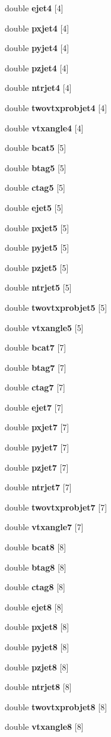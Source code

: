 \begin{DoxyCompactItemize}
double {\bf ejet4} [4]
\item 
double {\bf pxjet4} [4]
\item 
double {\bf pyjet4} [4]
\item 
double {\bf pzjet4} [4]
\item 
double {\bf ntrjet4} [4]
\item 
double {\bf twovtxprobjet4} [4]
\item 
double {\bf vtxangle4} [4]
\item 
double {\bf bcat5} [5]
\item 
double {\bf btag5} [5]
\item 
double {\bf ctag5} [5]
\item 
double {\bf ejet5} [5]
\item 
double {\bf pxjet5} [5]
\item 
double {\bf pyjet5} [5]
\item 
double {\bf pzjet5} [5]
\item 
double {\bf ntrjet5} [5]
\item 
double {\bf twovtxprobjet5} [5]
\item 
double {\bf vtxangle5} [5]
\item 
double {\bf bcat7} [7]
\item 
double {\bf btag7} [7]
\item 
double {\bf ctag7} [7]
\item 
double {\bf ejet7} [7]
\item 
double {\bf pxjet7} [7]
\item 
double {\bf pyjet7} [7]
\item 
double {\bf pzjet7} [7]
\item 
double {\bf ntrjet7} [7]
\item 
double {\bf twovtxprobjet7} [7]
\item 
double {\bf vtxangle7} [7]
\item 
double {\bf bcat8} [8]
\item 
double {\bf btag8} [8]
\item 
double {\bf ctag8} [8]
\item 
double {\bf ejet8} [8]
\item 
double {\bf pxjet8} [8]
\item 
double {\bf pyjet8} [8]
\item 
double {\bf pzjet8} [8]
\item 
double {\bf ntrjet8} [8]
\item 
double {\bf twovtxprobjet8} [8]
\item 
double {\bf vtxangle8} [8]

\end{DoxyCompactItemize}

